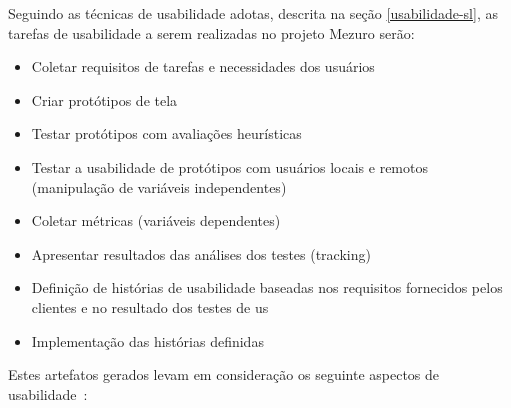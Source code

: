 Seguindo as técnicas de usabilidade adotas, descrita na seção \ref{usabilidade-sl}, as tarefas de usabilidade a serem realizadas no projeto Mezuro serão:
\begin{itemize}
\item Coletar requisitos de tarefas e necessidades dos usuários
\item Criar protótipos de tela
\item Testar protótipos com avaliações heurísticas
\item Testar a usabilidade de protótipos com usuários locais e remotos (manipulação de variáveis independentes)
\item Coletar métricas (variáveis dependentes)
\item Apresentar resultados das análises dos testes (tracking)
\item Definição de histórias de usabilidade baseadas nos requisitos fornecidos pelos clientes e no resultado dos testes de us
\item Implementação das histórias definidas
\end{itemize}

Estes artefatos gerados levam em consideração os seguinte aspectos de usabilidade~\cite{ergolist2013}:

